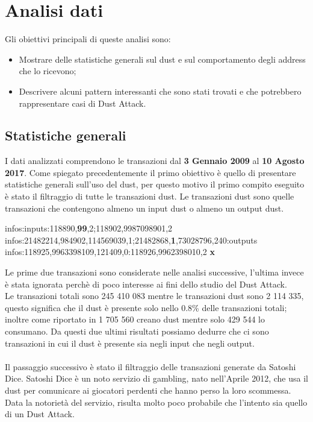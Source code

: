 \chapter{Analisi dati}
Gli obiettivi principali di queste analisi sono:
\begin{itemize}
    \item Mostrare delle statistiche generali sul dust e sul comportamento degli address che lo ricevono;
    \item Descrivere alcuni pattern interessanti che sono stati trovati e che potrebbero rappresentare casi di Dust Attack.
\end{itemize}
\section{Statistiche generali}
I dati analizzati comprendono le transazioni dal \textbf{3 Gennaio 2009} al \textbf{10 Agosto 2017}.
Come spiegato precedentemente il primo obiettivo è quello di presentare statistiche generali sull'uso del dust, per questo motivo il primo compito eseguito è stato il filtraggio di tutte le transazioni dust. Le transazioni dust sono quelle transazioni che contengono almeno un input dust o almeno un output dust.
\begin{mdframed}
 infos:inputs:118890,\textbf{99},2;118902,9987098901,2 \checkmark\\
 infos:21482214,984902,114569039,1;21482868,\textbf{1},73028796,240:outputs \checkmark\\
 infos:118925,9963398109,121409,0:118926,9962398010,2 \textbf{x}
\end{mdframed}
Le prime due transazioni sono considerate nelle analisi successive, l'ultima invece è stata ignorata perchè di poco interesse ai fini dello studio del Dust Attack.\\
Le transazioni totali sono 245 410 083 mentre le transazioni dust sono 2 114 335, questo significa che il dust è presente solo nello 0.8\% delle transazioni totali; inoltre come riportato in\cite{dustAnalisi} 1 705 560 creano dust mentre solo 429 544 lo consumano. Da questi due ultimi risultati possiamo dedurre che ci sono transazioni in cui il dust è presente sia negli input che negli output.\\\\
Il passaggio successivo è stato il filtraggio delle transazioni generate da Satoshi Dice. Satoshi Dice\cite{SD} è un noto servizio di gambling, nato nell'Aprile 2012, che usa il dust per comunicare ai giocatori perdenti che hanno perso la loro scommessa. Data la notorietà del servizio, risulta molto poco probabile che l'intento sia quello di un Dust Attack.\\
